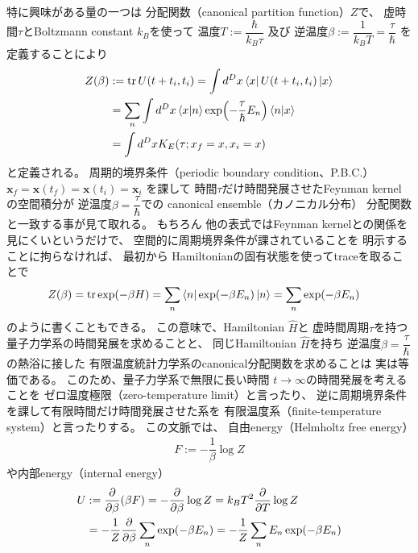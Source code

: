 特に興味がある量の一つは
分配関数（canonical partition function）$Z$で、
虚時間$\tau$とBoltzmann constant $k_B$を使って
温度$T := \dfrac{\hbar}{k_B \tau}$
及び
逆温度$ \beta := \dfrac{1}{k_B T}
= \dfrac{\tau}{\hbar} $
を定義することにより
\begin{align}
    Z( \beta )
    &:=
    \tr
    U (t + t_i, t_i)
    =
    \int d^D x
    \bra{ x }
        U (t + t_i, t_i)
    \ket{ x }
\notag\\&
    =
    \sum_n
    \int d^D x
    \braket{ x | n }
        \exp(
            -
            \dfrac{ \tau }{ \hbar }
            E_n
        )
    \braket{ n | x }
\notag\\&
    =
    \int d^D x
    K_E ( \tau; x_f = x,
        x_i = x )
\label{P.B.C. path int and partition function}
\end{align}
と定義される。
周期的境界条件（periodic boundary condition、P.B.C.）
$\bm{x}_f = \bm{x}(t_f) = \bm{x}(t_i) = \bm{x}_i$
を課して
時間$\tau$だけ時間発展させたFeynman kernelの空間積分が
逆温度$\beta = \dfrac{\tau}{\hbar}$での
canonical ensemble（カノニカル分布）
分配関数と一致する事が見て取れる。
もちろん
他の表式ではFeynman kernelとの関係を見にくいというだけで、
空間的に周期境界条件が課されていることを
明示することに拘らなければ、
最初から
Hamiltonianの固有状態を使ってtraceを取ることで
\begin{align}
    Z( \beta )
    &=
    \tr
        \exp(
            - \beta H
        )
    =
    \sum_n
    \bra{n}
        \exp(
            -
            \beta E_n
        )
    \ket{n}
    =
    \sum_n
    \exp(
        -
        \beta E_n
    )
\end{align}
のように書くこともできる。
この意味で、Hamiltonian $\hat{H}$と
虚時間周期$\tau$を持つ
量子力学系の時間発展を求めることと、
同じHamiltonian $\hat{H}$を持ち
逆温度$\beta = \dfrac{\tau}{\hbar}$の熱浴に接した
有限温度統計力学系のcanonical分配関数を求めることは
実は等価である。
このため、量子力学系で無限に長い時間
$t \to \infty$の時間発展を考えることを
ゼロ温度極限（zero-temperature limit）と言ったり、
逆に周期境界条件を課して有限時間だけ時間発展させた系を
有限温度系（finite-temperature system）と言ったりする。
この文脈では、
自由energy（Helmholtz free energy）
\begin{align}
    F
    :=
    -
    \dfrac{1}{\beta}
        \log Z
\end{align}
や内部energy（internal energy）
\begin{align}
    U
    &:=
    \dfrac{\partial}
        { \partial \beta }
        ( \beta F )
    =
    -
    \dfrac{\partial}
        { \partial \beta }
        \log Z
    =
    k_B T^2
    \dfrac{\partial}
        { \partial T }
        \log Z
\notag\\&
    =
    -
    \dfrac{1}{Z}
    \dfrac{\partial}{\partial \beta}
    \sum_n
    \exp(
        -
        \beta E_n
    )
    =
    -
    \dfrac{1}{Z}
    \sum_n
    E_n
    \exp(
        -
        \beta E_n
    )
\end{align}
